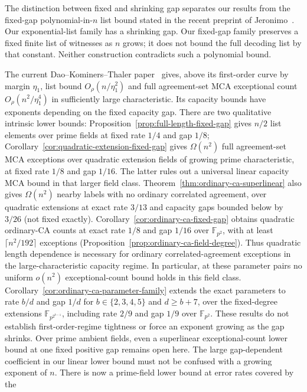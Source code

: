 \documentclass[11pt,letterpaper]{article}
\theoremstyle{definition}
\theoremstyle{remark}
\newcommand{\F}{\mathbb F}
\begin{document}
The distinction between fixed and shrinking gap separates our
results from the fixed-gap polynomial-in-$n$ list bound stated in the
recent preprint of Jeronimo~\cite{jeronimo}. Our exponential-list
family has a shrinking gap. Our fixed-gap family preserves a fixed finite
list of witnesses as $n$ grows; it does not bound the full decoding list
by that constant. Neither construction contradicts such a polynomial bound.

The current Dao--Kominers--Thaler paper~\cite{dkt2026} gives, above its
first-order curve by margin $\eta_1$, list bound
$O_\rho(n/\eta_1^2)$ and full agreement-set MCA exceptional count
$O_\rho(n^2/\eta_1^4)$ in sufficiently large characteristic. Its capacity
bounds have exponents depending on the fixed capacity gap.
There are two qualitative intrinsic lower bounds:
Proposition~\ref{prop:full-length-fixed-gap} gives $n/2$ list elements
over prime fields at fixed rate $1/4$ and gap $1/8$;
Corollary~\ref{cor:quadratic-extension-fixed-gap} gives
$\Omega(n^2)$ full agreement-set MCA exceptions over quadratic extension
fields of growing prime characteristic, at fixed rate $1/8$ and gap $1/16$.
The latter rules out a universal linear capacity MCA bound in that
larger field class. Theorem~\ref{thm:ordinary-ca-superlinear} also gives
$\Omega(n^2)$ nearby labels with no ordinary
correlated agreement, over quadratic extensions at exact rate $3/13$
and capacity gaps bounded below by $3/26$ (not fixed exactly).
Corollary~\ref{cor:ordinary-ca-fixed-gap} obtains quadratic ordinary-CA
counts at exact rate $1/8$ and gap $1/16$ over $\F_{p^2}$,
with at least $\lceil n^2/192\rceil$ exceptions
(Proposition~\ref{prop:ordinary-ca-field-degree}).
Thus quadratic length dependence is necessary for ordinary
correlated-agreement exceptions in the large-characteristic capacity regime.
In particular, at these parameter pairs no uniform $o(n^2)$
exceptional-count bound holds in this field class.
Corollary~\ref{cor:ordinary-ca-parameter-family} extends the exact
parameters to rate $b/d$ and gap $1/d$ for $b\in\{2,3,4,5\}$ and
$d\ge b+7$, over the fixed-degree extensions $\F_{p^{2^{b-1}}}$,
including rate $2/9$ and gap $1/9$ over $\F_{p^2}$.
These results do not establish first-order-regime tightness or force
an exponent growing as the gap shrinks. Over prime
ambient fields, even a superlinear exceptional-count lower bound at
one fixed positive gap remains open here. The large gap-dependent
coefficient in our linear lower bound must not be confused with a
growing exponent of $n$.
There is now a prime-field lower bound at error rates covered by the
\end{document}
